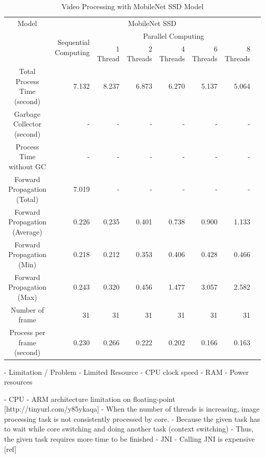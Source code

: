         \begin{table}[!htp]\centering
            \scriptsize
            \begin{tabular}{lrrrrrrrr}\toprule
                \multicolumn{2}{c}{Model} &\multicolumn{6}{c}{MobileNet SSD} \\\cmidrule{1-8}
                \multicolumn{2}{c}{\multirow{2}{*}{}} &\multirow{2}{*}{Sequential Computing} &\multicolumn{5}{c}{Parallel Computing} \\\cmidrule{4-8}
                & & &1 Thread &2 Threads &4 Threads &6 Threads &8 Threads \\\midrule
                \multicolumn{2}{c}{Total Process Time (second)} &7.132 &8.237 &6.873 &6.270 &5.137 &5.064 \\
                \multicolumn{2}{c}{Garbage Collector (second)} &- &- &- &- &- &- \\
                \multicolumn{2}{c}{Process Time without GC} &- &- &- &- &- &- \\
                \multicolumn{2}{c}{Forward Propagation (Total)} &7.019 &- &- &- &- &- \\
                \multicolumn{2}{c}{Forward Propagation (Average)} &0.226 &0.235 &0.401 &0.738 &0.900 &1.133 \\
                \multicolumn{2}{c}{Forward Propagation (Min)} &0.218 &0.212 &0.353 &0.406 &0.428 &0.466 \\
                \multicolumn{2}{c}{Forward Propagation (Max)} &0.243 &0.320 &0.456 &1.477 &3.057 &2.582 \\
                \multicolumn{2}{c}{Number of frame} &31 &31 &31 &31 &31 &31 \\
                \multicolumn{2}{c}{Process per frame (second)} &0.230 &0.266 &0.222 &0.202 &0.166 &0.163 \\
                \bottomrule
            \end{tabular}

            \caption{Video Processing with MobileNet SSD Model}\label{ssd:performance}
        \end{table}

        -	Limitation / Problem
            - Limited Resource
                - CPU clock speed
                - RAM
                - Power resources

            - CPU
                - ARM architecture limitation on floating-point [http://tinyurl.com/y85ykaqa]
                - When the number of threads is increasing, image processing task is not consistently processed by core.
                    - Because the given task has to wait while core switching and doing another task (context switching)
                    - Thus, the given task requires more time to be finished
            - JNI
                - Calling JNI is expensive [ref]


